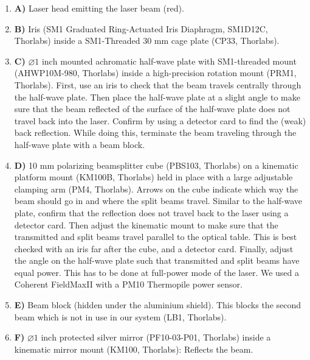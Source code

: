 \documentclass[10pt,letterpaper]{article}
\begin{document}
\begin{enumerate}[]
    \item \textbf{A)} Laser head emitting the laser beam (red).
    
    \item \textbf{B)} Iris (SM1 Graduated Ring-Actuated Iris Diaphragm, SM1D12C, Thorlabs) inside a SM1-Threaded 30 mm cage plate (CP33, Thorlabs).
    
    \item \textbf{C)} $\diameter1\text{ inch}$ mounted achromatic half-wave plate with SM1-threaded mount (AHWP10M-980, Thorlabs) inside a high-precision rotation mount (PRM1, Thorlabs). First, use an iris to check that the beam travels centrally through the half-wave plate. Then place the half-wave plate at a slight angle to make sure that the beam reflected of the surface of the half-wave plate does not travel back into the laser. Confirm by using a detector card to find the (weak) back reflection. While doing this, terminate the beam traveling through the half-wave plate with a beam block.
    
    \item \textbf{D)} 10 mm polarizing beamsplitter cube (PBS103, Thorlabs) on a kinematic platform mount (KM100B, Thorlabs) held in place with a large adjustable clamping arm (PM4, Thorlabs). Arrows on the cube indicate which way the beam should go in and where the split beams travel. Similar to the half-wave plate, confirm that the reflection does not travel back to the laser using a detector card. Then adjust the kinematic mount to make sure that the transmitted and split beams travel parallel to the optical table. This is best checked with an iris far after the cube, and a detector card. Finally, adjust the angle on the half-wave plate such that transmitted and split beams have equal power. This has to be done at full-power mode of the laser. We used a Coherent FieldMaxII with a PM10 Thermopile power sensor.
    
    \item \textbf{E)} Beam block (hidden under the aluminium shield). This blocks the second beam which is not in use in our system (LB1, Thorlabs).
    
    \item \textbf{F)} $\diameter1\text{ inch}$ protected silver mirror (PF10-03-P01, Thorlabs) inside a kinematic mirror mount (KM100, Thorlabs): Reflects the beam.
    

\end{enumerate}
\end{document}
